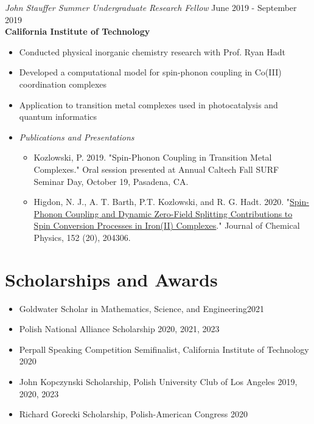 \documentclass[margin,line]{resume}
\begin{document}
\begin{resume}
{\sl John Stauffer Summer Undergraduate Research Fellow} \hfill June 2019 - September 2019 \\
\textbf{California Institute of Technology}
\begin{itemize}
\item Conducted physical inorganic chemistry research with Prof. Ryan Hadt
\item Developed a computational model for spin-phonon coupling in Co(III)
coordination complexes
\item Application to transition metal complexes used in photocatalysis and quantum informatics
\item \emph{Publications and Presentations}
    \begin{itemize}
            \item Kozlowski, P. 2019. "Spin-Phonon Coupling in Transition Metal Complexes." Oral session presented at Annual Caltech Fall SURF Seminar Day, October 19, Pasadena, CA.
    \item Higdon, N. J., A. T. Barth, P.T. Kozlowski, and R. G. Hadt. 2020. "\href{https://doi.org/10.1063/5.0006361}{Spin-Phonon Coupling and Dynamic Zero-Field Splitting Contributions to Spin Conversion Processes in Iron(II) Complexes}." Journal of Chemical Physics, 152 (20), 204306.
    \end{itemize}
\end{itemize}
\section{\mysidestyle Scholarships and Awards}
\begin{itemize}
    \item  \textnormal{Goldwater Scholar in Mathematics, Science, and Engineering}\hfill 2021
    \item \textnormal{Polish National Alliance Scholarship} \hfill 2020, 2021, 2023
    \item \textnormal{Perpall Speaking Competition} Semifinalist, California Institute of Technology \hfill 2020
    \item \textnormal{John Kopczynski Scholarship}, Polish University Club of Los Angeles \hfill 2019, 2020, 2023
    \item \textnormal{Richard Gorecki Scholarship}, Polish-American Congress \hfill 2020
\end{itemize}

\newpage

\end{resume}
\end{document}
